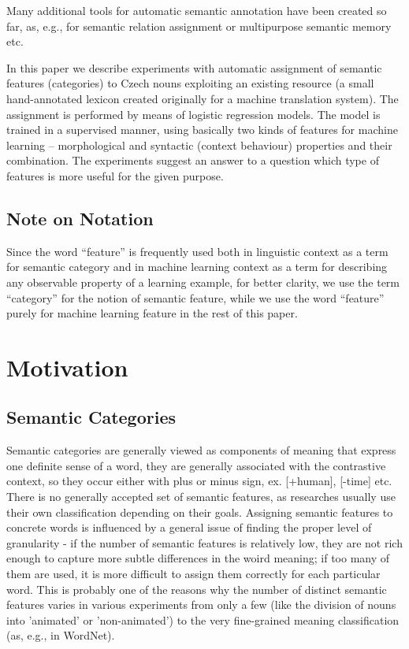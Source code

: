 \documentclass[letterpaper]{article}
\begin{document}
Many additional tools for automatic semantic annotation have been created so far, as, e.g., 
for semantic relation assignment \cite{peirsman} or multipurpose semantic memory \cite{baroni:2009} etc.  
 
In this paper we describe experiments with automatic assignment of semantic features (categories) to Czech nouns
exploiting an existing resource (a small hand-annotated lexicon created originally for a machine translation system). The assignment is performed by means of logistic regression models. The model is trained in a supervised manner, using 
basically two kinds of features for machine learning --  morphological and syntactic (context behaviour) properties and their combination. The experiments suggest an answer to a question which type of features is more useful for the given purpose.   


\subsection{Note on Notation}
Since the word ``feature'' is frequently used both in linguistic context as a term for semantic category and in 
machine learning context as a term for describing any observable property of a learning example, for 
better clarity, we use the term ``category'' for the notion of semantic feature, 
while we use the word ``feature'' purely for machine learning feature in the rest of this paper.


\section{Motivation}
\subsection{Semantic Categories}
Semantic categories are generally viewed as components of meaning
that express one definite sense of a word, they are generally associated
with the contrastive context, so they occur either with plus or minus
sign, ex. [+human], [-time] etc. 
There is no generally accepted set of semantic features, as researches
usually use their own classification depending on their goals. Assigning 
semantic features to concrete words is influenced by a general issue 
of finding the proper level of granularity - if the number of semantic features is relatively 
low, they are not rich enough to capture more subtle differences in the woird meaning;
if too many of them are used, it is more difficult to assign them correctly
for each particular word. This is probably one of the reasons why the 
number of distinct semantic features varies in various experiments 
from only a few (like
the division of nouns into 'animated' or 'non-animated') to the very
fine-grained meaning classification (as, e.g., in WordNet).
\end{document}
